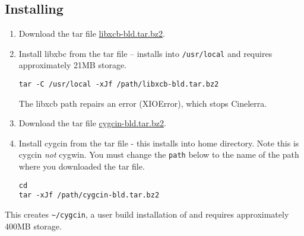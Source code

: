 \subsection*{Installing \CGG{}}
\label{sec:installing_cinelerra}

\begin{enumerate}
\item Download the tar file
  \href{https://cinelerra-gg.org/download/testing/libxcb-bld.tar.bz2}{libxcb-bld.tar.bz2}.

\item Install libxbc from the tar file -- installs into
  \texttt{/usr/local} and requires approximately 21MB storage.
\begin{lstlisting}[style=sh]
tar -C /usr/local -xJf /path/libxcb-bld.tar.bz2
\end{lstlisting}
  The libxcb path repairs an error (XIOError), which stops
  Cinelerra.

\item Download the tar file
  \href{https://cinelerra-gg.org/download/testing/cygcin-bld.tar.bz2}{cygcin-bld.tar.bz2}.

\item Install cygcin from the tar file - this installs into home
  directory.  Note this is cygcin \emph{not} cygwin. You must change the
  \texttt{path} below to the name of the path where you downloaded
  the tar file.
\begin{lstlisting}[style=sh]
cd
tar -xJf /path/cygcin-bld.tar.bz2
\end{lstlisting}
\end{enumerate}

This creates \texttt{\~{}/cygcin}, a user build installation of
\CGG{} and requires approximately 400MB storage.

